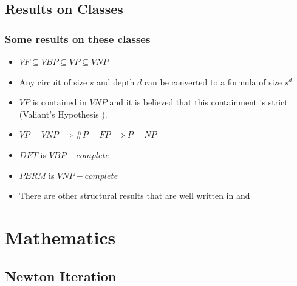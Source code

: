 \documentclass[10pt]{beamer}
\begin{document}

\subsection{Results on Classes}


\begin{frame}
\frametitle{Some results on these classes}
	\begin{itemize}
 \item $VF\subseteq VBP \subseteq VP \subseteq VNP$
 \item Any circuit of size $s$ and depth $d$ can be converted to a formula of size $s^d$ 
	    \item $VP$ is contained in $VNP$ and it is believed that this containment is strict (Valiant's Hypothesis \cite{Valiant1979CompletenessCI}).
     \item $VP= VNP\implies \#P=FP\implies P= NP$
     \item $DET$ is $VBP-complete$ \cite{Mahajan1997ACA}
     \item $PERM$ is $VNP-complete$ \cite{completeburg}
     \item There are other structural results that are well written in \cite{ramsurvey} and \cite{shpilkasurvey}
     \end{itemize}
\end{frame}


\section{Mathematics}
\subsection{Newton Iteration}
\end{document}
